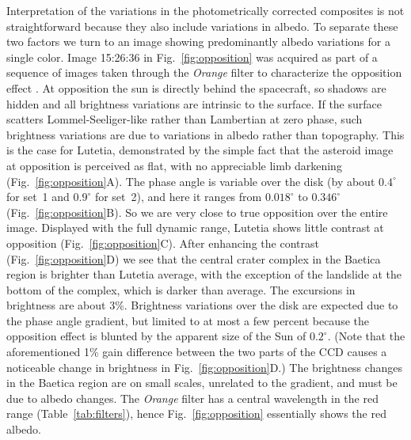 \documentclass[3p,authoryear]{elsarticle}
\begin{document}
Interpretation of the variations in the photometrically corrected composites is not straightforward because they also include variations in albedo. To separate these two factors we turn to an image showing predominantly albedo variations for a single color. Image 15:26:36 in Fig.~\ref{fig:opposition} was acquired as part of a sequence of images taken through the {\it Orange} filter to characterize the opposition effect \citep{G56}. At opposition the sun is directly behind the spacecraft, so shadows are hidden and all brightness variations are intrinsic to the surface. If the surface scatters Lommel-Seeliger-like rather than Lambertian at zero phase, such brightness variations are due to variations in albedo rather than topography. This is the case for Lutetia, demonstrated by the simple fact that the asteroid image at opposition is perceived as flat, with no appreciable limb darkening (Fig.~\ref{fig:opposition}A). The phase angle is variable over the disk (by about $0.4^\circ$ for set~1 and $0.9^\circ$ for set~2), and here it ranges from $0.018^\circ$ to $0.346^\circ$ (Fig.~\ref{fig:opposition}B). So we are very close to true opposition over the entire image. Displayed with the full dynamic range, Lutetia shows little contrast at opposition (Fig.~\ref{fig:opposition}C). After enhancing the contrast (Fig.~\ref{fig:opposition}D) we see that the central crater complex in the Baetica region is brighter than Lutetia average, with the exception of the landslide at the bottom of the complex, which is darker than average. The excursions in brightness are about 3\%. Brightness variations over the disk are expected due to the phase angle gradient, but limited to at most a few percent because the opposition effect is blunted by the apparent size of the Sun of $0.2^\circ$. (Note that the aforementioned 1\% gain difference between the two parts of the CCD causes a noticeable change in brightness in Fig.~\ref{fig:opposition}D.) The brightness changes in the Baetica region are on small scales, unrelated to the gradient, and must be due to albedo changes. The {\it Orange} filter has a central wavelength in the red range (Table~\ref{tab:filters}), hence Fig.~\ref{fig:opposition} essentially shows the red albedo.
\end{document}
